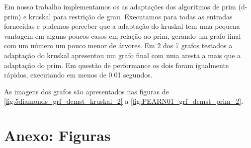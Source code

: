 \documentclass[12pt,a4paper]{article}
\begin{document}
Em nosso trabalho implementamos os as adaptações dos algoritmos de prim (d-prim)
e kruskal para restrição de grau. Executamos para todas as entradas fornecidas e
pudemos perceber que a adaptação do kruskal tem uma pequena vantagem em alguns
poucos casos em relação ao prim, gerando um grafo final com um número um pouco
menor de árvores. Em 2 dos 7 grafos testados a adaptação do kruskal apresentou
um grafo final com uma aresta a mais que a adaptação do prim. Em questão de
performance os dois foram igualmente rápidos, executando em menos de 0.01
segundos.

As imagens dos grafos são apresentados nas figuras de
\ref{fig:5diamonds_grf_dcmst_kruskal_2} a \ref{fig:PEARN01_grf_dcmst_prim_2}.



\section{Anexo: Figuras}

\end{document}
